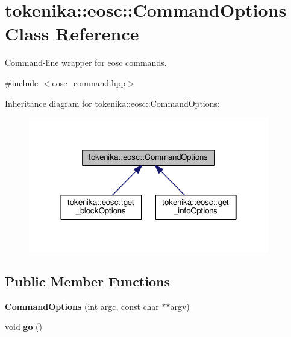 \hypertarget{classtokenika_1_1eosc_1_1_command_options}{}\section{tokenika\+:\+:eosc\+:\+:Command\+Options Class Reference}
\label{classtokenika_1_1eosc_1_1_command_options}


Command-\/line wrapper for eosc commands.  




{\ttfamily \#include $<$eosc\+\_\+command.\+hpp$>$}



Inheritance diagram for tokenika\+:\+:eosc\+:\+:Command\+Options\+:\nopagebreak
\begin{figure}[H]
\begin{center}
\leavevmode
\includegraphics[width=298pt]{classtokenika_1_1eosc_1_1_command_options__inherit__graph}
\end{center}
\end{figure}
\subsection*{Public Member Functions}
\begin{DoxyCompactItemize}
\item 
\mbox{\label{classtokenika_1_1eosc_1_1_command_options_a263a61f90aa324090e2d9d592b2d4ad6}} 
{\bfseries Command\+Options} (int argc, const char $\ast$$\ast$argv)
\item 
\mbox{\label{classtokenika_1_1eosc_1_1_command_options_a4fa1c9defc45b139e415c79c43b15e5d}} 
void {\bfseries go} ()
\end{DoxyCompactItemize}
